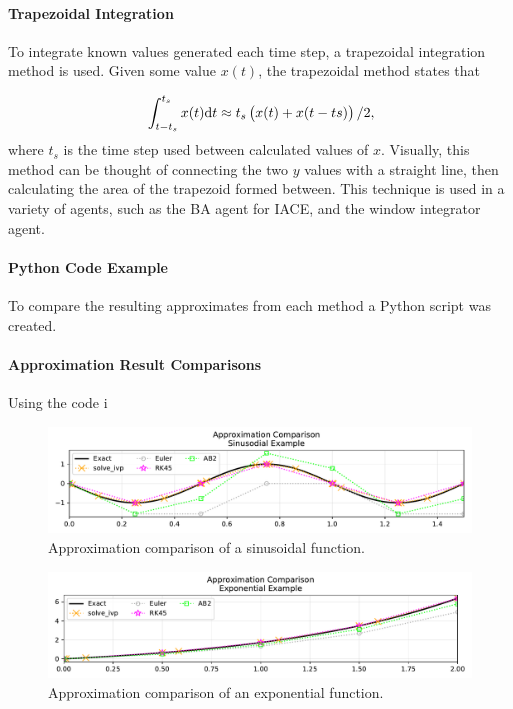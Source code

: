 \documentclass[12pt]{article}
\begin{document}
\paragraph{Trapezoidal Integration}
To integrate known values generated each time step, a trapezoidal integration method is used.
Given some value $x(t)$, the trapezoidal method states that

\begin{equation}{\label{eq: trapezoidal int} }
\int_{t-t_s}^{t_s}x(t) \text{d}t \approx t_s\left( x(t)+x(t-ts) \right)/2,
\end{equation}%
where $t_s$ is the time step used between calculated values of $x$.
Visually, this method can be thought of connecting the two $y$ values with a straight line, then calculating the area of the trapezoid formed between.
This technique is used in a variety of agents, such as the BA agent for IACE, and the window integrator agent. 

\paragraph{Python Code Example}
To compare the resulting approximates from each method a Python script was created.


\paragraph{Approximation Result Comparisons}
Using the code i

\begin{figure}[H]
	\centering
	\footnotesize
	\includegraphics[width=\linewidth]{figures/sinEx}
	\caption{Approximation comparison of a sinusoidal function.}
	\label{fig: sin ex}
\end{figure}

\begin{figure}[H]
	\centering
	\footnotesize
	\includegraphics[width=\linewidth]{figures/expEx}
	\caption{Approximation comparison of an exponential function.}
	\label{fig: exp ex}
\end{figure}
\end{document}
